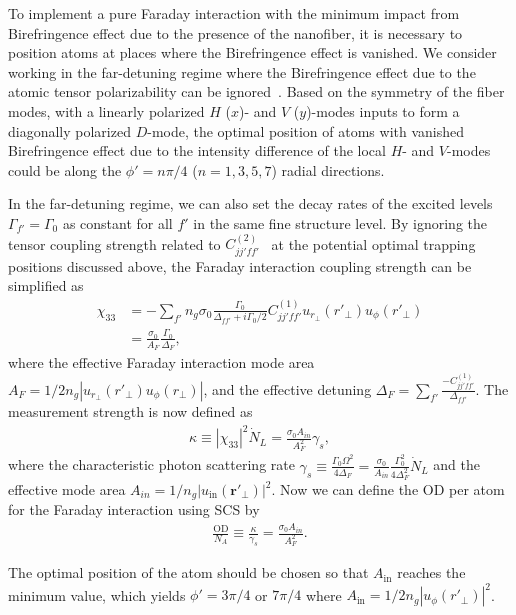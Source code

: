\documentclass[preprint,aps,pra,onecolumn,superscriptaddress]{revtex4-1} %
\def\br{\mathbf{r}}
\begin{document}
To implement a pure Faraday interaction with the minimum impact from Birefringence effect due to the presence of the nanofiber, it is necessary to position atoms at places where the Birefringence effect is vanished. 
We consider working in the far-detuning regime where the Birefringence effect due to the atomic tensor polarizability can be ignored~\cite{Deutsch2010a}. 
Based on the symmetry of the fiber modes, with a linearly polarized $H$ ($x$)- and $V$ ($ y $)-modes inputs to form a diagonally polarized $ D $-mode, the optimal position of atoms with vanished Birefringence effect due to the intensity difference of the local $ H $- and $ V $-modes could be along the $ \phi'=n\pi/4 $ ($ n=1,3,5,7 $) radial directions. 

In the far-detuning regime, we can also set the decay rates of the excited levels $ \Gamma_{f'}= \Gamma_0$ as constant for all $ f' $ in the same fine structure level.
By ignoring the tensor coupling strength related to $ C_{jj'ff'}^{(2)} $~\cite{Deutsch2010a} at the potential optimal trapping positions discussed above, the Faraday interaction coupling strength can be simplified as
\begin{align}
\chi_{33} &= -\sum_{f'}n_g\sigma_0\frac{\Gamma_0}{\Delta_{ff'}+i\Gamma_0/2}C_{jj'ff'}^{(1)}u_{r\!_\perp}(r'\!_\perp)u_\phi(r'\!_\perp)\\
&=\frac{\sigma_0}{A_F}\frac{\Gamma_0}{\Delta_F},
\end{align}
where the effective Faraday interaction mode area $ A_F=1/2n_g|u_{r\!_\perp}(r'\!_\perp)u_\phi(r\!_\perp)| $, and the effective detuning $ \Delta_F=\sum_{f'}\frac{-C_{jj'ff'}^{(1)}}{\Delta_{ff'}} $.
The measurement strength is now defined as
\begin{align}
\kappa\equiv|\chi_{33}|^2\dot{N}_L=\frac{\sigma_0A_{in}}{A_F^2}\gamma_s,
\end{align}
where the characteristic photon scattering rate $ \gamma_s\equiv \frac{\Gamma_0\Omega^2}{4\Delta_F}=\frac{\sigma_0}{A_{in}}\frac{\Gamma_0^2}{4\Delta_F^2}\dot{N}_L $ and the effective mode area $ A_{in}=1/n_g|u_{\mathrm{in}}(\br'\!_\perp)|^2 $.
Now we can define the OD per atom for the Faraday interaction using SCS by
\begin{align}
\frac{\mathrm{OD}}{N_A} \equiv \frac{\kappa}{\gamma_s}=\frac{\sigma_0A_{in}}{A_F^2}.
\end{align}

The optimal position of the atom should be chosen so that $ A_{\mathrm{in}} $ reaches the minimum value, which yields $ \phi'=3\pi/4 $ or $ 7\pi/4 $ where $ A_{\mathrm{in}}=1/2n_g|u_\phi(r'\!_\perp)|^2 $.
\end{document}
